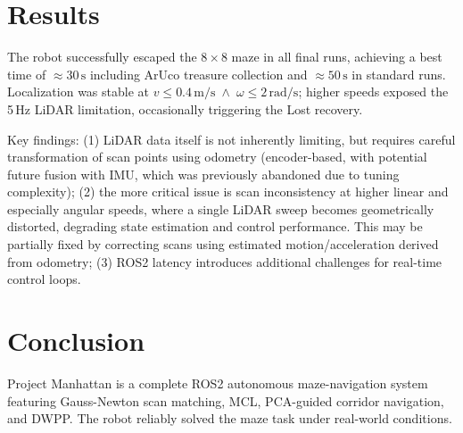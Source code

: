 \section{Results}

The robot successfully escaped the $8{\times}8$ maze in all final runs, achieving a best time
of ${\approx}30\,\text{s}$ including ArUco treasure collection and ${\approx}50\,\text{s}$ in
standard runs. Localization was stable at $v \leq 0.4\,\text{m/s} \;\land\; \omega \leq 2\,\text{rad/s}$; higher speeds exposed the
5\,Hz LiDAR limitation, occasionally triggering the Lost recovery.

Key findings: (1) LiDAR data itself is not inherently limiting, but requires careful transformation of 
scan points using odometry (encoder-based, with potential future fusion with IMU, which was previously 
abandoned due to tuning complexity); (2) the more critical issue is scan inconsistency at higher linear and 
especially angular speeds, where a single LiDAR sweep becomes geometrically distorted, degrading state 
estimation and control performance. This may be partially fixed by correcting scans using estimated 
motion/acceleration derived from odometry; (3) ROS2 latency introduces additional challenges for real-time 
control loops.

\section{Conclusion}

Project Manhattan is a complete ROS2 autonomous maze-navigation system featuring Gauss-Newton
scan matching, MCL, PCA-guided corridor navigation, and DWPP. The robot reliably solved the
maze task under real-world conditions.

